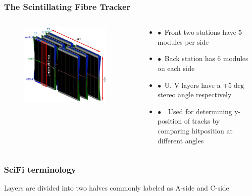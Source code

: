 \documentclass[aspectratio=1610, 12pt, xcolor=dvipsnames]{beamer}
\begin{document}
\begin{frame}\frametitle{The Scintillating Fibre Tracker}
  \begin{columns}
    \begin{column}[c]{0.48\textwidth}
      \begin{figure}
        \includegraphics[width=0.9\textwidth]{logos/scifi.png}
      \end{figure}
    \end{column}
    \begin{column}{0.48\textwidth}
      \begin{itemize}
        \item $\bullet$\, Front two stations have 5 modules per side
        \item $\bullet$\, Back station has 6 modules on each side
        \item $\bullet$\, U, V layers have a $\mp 5 \deg$ stereo angle respectively
        \item $\bullet$\, \to\, Used for determining y-position of tracks by comparing hitposition at different angles
      \end{itemize}
    \end{column}
  \end{columns}
\end{frame}

\begin{frame}\frametitle{SciFi terminology}
  Layers are divided into two halves commonly labeled as A-side and C-side
  
\end{frame}
\end{document}
